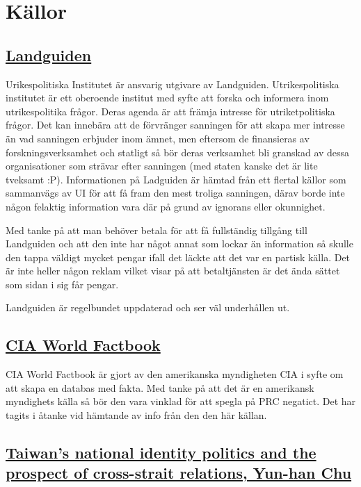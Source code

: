 \documentclass[a4paper,10pt]{article}
\begin{document}
\section*{Källor}
\subsection*{\href{https://www.landguiden.se/Lander/Asien/Taiwan}{Landguiden}}
Urikespolitiska Institutet är ansvarig utgivare av Landguiden. Utrikespolitiska institutet är ett oberoende institut med syfte att forska och informera inom utrikespolitika frågor. Deras agenda är att främja intresse för utriketpolitiska frågor. Det kan innebära att de förvränger sanningen för att skapa mer intresse än vad sanningen erbjuder inom ämnet, men eftersom de finansieras av forskningsverksamhet och statligt så bör deras verksamhet bli granskad av dessa organisationer som strävar efter sanningen (med staten kanske det är lite tveksamt :P). Informationen på Ladguiden är hämtad från ett flertal källor som sammanvägs av UI för att få fram den mest troliga sanningen, därav borde inte någon felaktig information vara där på grund av ignorans eller okunnighet. 

Med tanke på att man behöver betala för att få fullständig tillgång till Landguiden och att den inte har något annat som lockar än information så skulle den tappa väldigt mycket pengar ifall det läckte att det var en partisk källa. Det är inte heller någon reklam vilket visar på att betaltjänsten är det ända sättet som sidan i sig får pengar.

Landguiden är regelbundet uppdaterad och ser väl underhållen ut.
\subsection*{\href{https://www.cia.gov/library/publications/the-world-factbook/geos/tw.html}{CIA World Factbook}}
CIA World Factbook är gjort av den amerikanska myndigheten CIA i syfte om att skapa en databas med fakta. Med tanke på att det är en amerikansk myndighets källa så bör den vara vinklad för att spegla på PRC negatict. Det har tagits i åtanke vid hämtande av info från den den här källan.

\subsection*{\href{http://isites.harvard.edu/fs/docs/icb.topic199080.files/Readings_for_October_23_/Chu.AS.04.pdf}{Taiwan’s national identity politics and the prospect of cross-strait relations, Yun-han Chu}}

%
%
%
%
%
%
%
%
%
%
%
%
%
\end{document}
